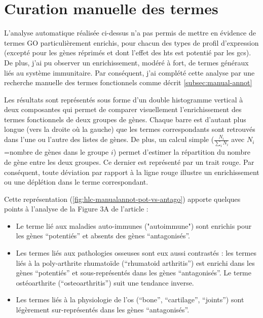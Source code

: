 \documentclass[../main.tex]{subfiles}
\begin{document}
\section{Curation manuelle des termes}
	L'analyse automatique réalisée ci-dessus n'a pas permis de mettre en évidence de termes GO particulièrement enrichis, pour chacun des types de profil d'expression (excepté pour les gènes réprimés et dont l'effet des \glspl{ht} est potentié par les \glspl{gc}).
	De plus, j'ai pu observer un enrichissement, modéré à fort, de termes généraux liés au système immunitaire. Par conséquent, j'ai complété cette analyse par une recherche manuelle des termes fonctionnels comme décrit \autoref{subsec:manual-annot}
	\par
	Les résultats sont représentés sous forme d'un double histogramme vertical à deux composantes qui permet de comparer visuellement l'enrichissement des termes fonctionnels de deux groupes de gènes.
	Chaque barre est d'autant plus longue (vers la droite où la gauche) que les termes correspondants sont retrouvés dans l'une ou l'autre des listes de gènes.
	De plus, un calcul simple ($\frac{N_{i}}{\sum_{i}N_{i}}$ avec $N_i$=nombre de gènes dans le groupe $i$) permet d'estimer la répartition du nombre de gène entre les deux groupes.
	Ce dernier est représenté par un trait rouge. Par conséquent, toute déviation par rapport à la ligne rouge illustre un enrichissement ou une déplétion dans le terme correspondant.
	\par
	Cette représentation (\autoref{fig:hlc-manualannot-pot-vs-antago}) apporte quelques points à l'analyse de la Figure 3A de l'article :
	\begin{itemize} 
		\item
			Le terme lié aux maladies auto-immunes ("autoimmune") sont enrichis pour les gènes ``potentiés'' et absents des gènes ``antagonisés''. 
		\item
			Les termes liés aux pathologies osseuses sont eux aussi contrastés :
			les termes liés à la poly-arthrite rhumatoïde (``rhumatoid arthritis'') est enrichi dans les gènes ``potentiés'' et sous-représentés dans les gènes ``antagonisés''.
			Le terme ostéoarthrite (``osteoarthritis'') suit une tendance inverse.
		\item
			Les termes liés à la physiologie de l'os (``bone'', ``cartilage'', ``joints'') sont légèrement sur-représentés dans les gènes ``antagonisés''.
	\end{itemize}
	
	
\end{document}
